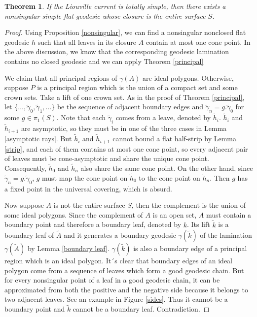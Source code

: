 \documentclass[reqno]{amsart}
\theoremstyle{plain}
\newtheorem{thm}{Theorem}[section]
\theoremstyle{definition}
\theoremstyle{remark}
\theoremstyle{definition}
\newcommand{\?}{\textcolor{red}{?}}
\begin{document}
\begin{thm}\label{dense}
If the Liouville current is totally simple, then there exists a nonsingular simple flat geodesic whose closure is the entire surface $S$. 
\end{thm}
\begin{proof}
Using Proposition \ref{nonsingular}, we can find a nonsingular nonclosed flat geodesic $h$ such that all leaves in its closure $A$ contain at most one cone point. In the above discussion, we know that the corresponding geodesic lamination contains no closed geodesic and we can apply Theorem \ref{principal}

We claim that all principal regions of $\gamma(A)$ are ideal polygons. Otherwise, suppose $P$ is a principal region which is the union of a compact set and some crown sets. Take a lift of one crown set. As in the proof of Theorem \ref{principal}, let $\{\ldots,\tilde{\gamma}_0,\tilde{\gamma}_1,\ldots\}$ be the sequence of adjacent boundary edges and $\tilde{\gamma}_n = g.\tilde{\gamma}_0$ for some $g\in\pi_1(S)$. Note that each $\tilde{\gamma}_i$ comes from a leave, denoted by $\tilde{h}_i$. $\tilde{h}_i$ and $\tilde{h}_{i+1}$ are asymptotic, so they must be in one of the three cases in Lemma \ref{asymptotic rays}. But $\tilde{h}_i$ and $\tilde{h}_{i+1}$ cannot bound a flat half-strip by Lemma \ref{strip}, and each of them contains at most one cone point, so every adjacent pair of leaves must be cone-asymptotic and share the unique cone point. Consequently, $\tilde{h}_0$ and $\tilde{h}_n$ also share the same cone point. On the other hand, since $\tilde{\gamma}_n = g.\tilde{\gamma}_0$, $g$ must map the cone point on $\tilde{h}_0$ to the cone point on $\tilde{h}_n$. Then $g$ has a fixed point in the universal covering, which is absurd.

Now suppose $A$ is not the entire surface $S$, then the complement is the union of some ideal polygons. Since the complement of $A$ is an open set, $A$ must contain a boundary point and therefore a boundary leaf, denoted by $k$. Its lift $\tilde{k}$ is a boundary leaf of $\tilde{A}$ and it generates a boundary geodesic $\gamma(\tilde{k})$ of the lamination $\gamma(\tilde{A})$ by Lemma \ref{boundary leaf}. $\gamma(\tilde{k})$ is also a boundary edge of a principal region which is an ideal polygon. It´s clear that boundary edges of an ideal polygon come from a sequence of leaves which form a good geodesic chain. But for every nonsingular point of a leaf in a good geodesic chain, it can be approximated from both the positive and the negative side because it belongs to two adjacent leaves. See an example in Figure \ref{sides}. Thus it cannot be a boundary point and $\tilde{k}$ cannot be a boundary leaf. Contradiction.
\end{proof}
\end{document}
